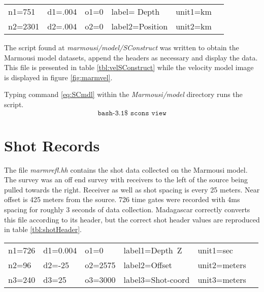 {
\begin{tabular}{|llllll|}
        \hline        
    n1=751    &     d1=.004   &        o1=0  &        label= Depth     & unit1=km &  \\ 
    n2=2301   &     d2=.004  &        o2=0  &        label2=Position  & unit2=km &  \\
	\hline
\end{tabular}
}

The script found at \emph{marmousi/model/SConstruct} was written to obtain the Marmousi model datasets, append the headers as necessary and display the  data.  This file is presented in table \ref{tbl:velSConstruct} while the velocity model image is displayed in figure \ref{fig:marmvel}.
 
{
\tiny

\normalsize
}


Typing command \ref{eq:SCmdl} within the \emph{Marmousi\slash model} directory runs the script.
\begin{equation}\label{eq:SCmdl} \texttt{bash-3.1\$\ scons\ view} \end{equation}


\section{Shot Records}
The file \emph{marmrefl.hh} contains the shot data collected on the Marmousi model.  The survey was an off end survey with receivers to the left of the source being pulled towards the right.  Receiver as well as shot spacing is every 25 meters.  Near offset is 425 meters from the source.  726 time gates were recorded with 4ms spacing for roughly 3 seconds of data collection.  Madagascar correctly converts this file according to its header, but the correct shot header values are reproduced in table \ref{tbl:shotHeader}.   

{
	\begin{tabular}{|llllll|}
	\hline  
	    n1=726 &  d1=0.004 &  o1=0     &  label1=Depth\ Z   &   unit1=sec     & \\
    	    n2=96  &  d2=-25   &  o2=2575  &  label2=Offset     &   unit2=meters  & \\
            n3=240 &  d3=25    &  o3=3000  &  label3=Shot-coord &   unit3=meters  & \\
	\hline
	\end{tabular}
}

